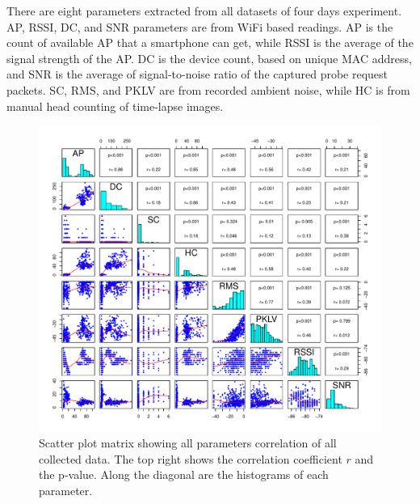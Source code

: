 	There are eight parameters extracted from all datasets of four days experiment. \ac{AP}, \ac{RSSI}, \ac{DC}, and \ac{SNR} parameters are from WiFi based readings. \ac{AP} is the count of available \ac{AP} that a smartphone can get, while \ac{RSSI} is the average of the signal strength of the \ac{AP}. \ac{DC} is the device count, based on unique \ac{MAC} address, and \ac{SNR} is the average of signal-to-noise ratio of the captured probe request packets. \ac{SC}, \ac{RMS}, and \ac{PKLV} are from recorded ambient noise, while \ac{HC} is from manual head counting of time-lapse images.

	\begin{figure}[h]
		\begin{adjustwidth}{-3cm}{}
		\centering
		\includegraphics[width=1.3\textwidth]{./img/result/all-result}
		\end{adjustwidth}
		\caption[Scatter plot matrix showing all parameters correlation.]
		{Scatter plot matrix showing all parameters correlation of all collected data. The top right shows the correlation coefficient $r$ and the p-value. Along the diagonal are the histograms of each parameter.}
		\label{fig:scatterplot-matrix}
	\end{figure}


